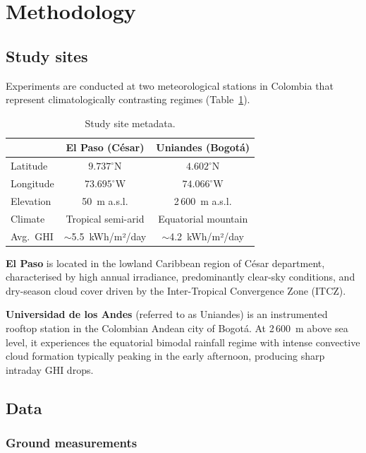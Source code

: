 \section{Methodology}
\label{sec:methodology}
\subsection{Study sites}

Experiments are conducted at two meteorological stations in Colombia that represent
climatologically contrasting regimes (Table~\ref{tab:sites}).

\begin{table}[t]
  \centering
  \caption{Study site metadata.}
  \label{tab:sites}
  \begin{tabular}{lcc}
    \toprule
    & \textbf{El Paso (César)} & \textbf{Uniandes (Bogotá)} \\
    \midrule
    Latitude  & $9.737^{\circ}\text{N}$ & $4.602^{\circ}\text{N}$ \\
    Longitude & $73.695^{\circ}\text{W}$ & $74.066^{\circ}\text{W}$ \\
    Elevation & 50~m a.s.l.      & 2\,600~m a.s.l.  \\
    Climate   & Tropical semi-arid & Equatorial mountain \\
    Avg.\ GHI & ${\sim}$5.5~kWh/m²/day & ${\sim}$4.2~kWh/m²/day \\
    \bottomrule
  \end{tabular}
\end{table}

\textbf{El Paso} is located in the lowland Caribbean region of C{\'e}sar department,
characterised by high annual irradiance, predominantly clear-sky conditions, and
dry-season cloud cover driven by the Inter-Tropical Convergence Zone (ITCZ).

\textbf{Universidad de los Andes} (referred to as Uniandes) is an instrumented
rooftop station in the Colombian Andean city of Bogot{\'a}. At 2\,600~m above sea
level, it experiences the equatorial bimodal rainfall regime with intense convective
cloud formation typically peaking in the early afternoon, producing sharp intraday
GHI drops.

\subsection{Data}

\subsubsection{Ground measurements}

